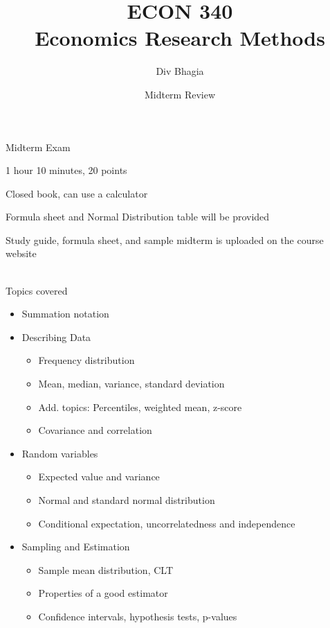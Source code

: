 \documentclass{./../div_teaching_slides}
\begin{document}
\title{ECON 340 \\ Economics Research Methods}
\author{Div Bhagia}
\date{Midterm Review}

\begin{frame}
\maketitle
\end{frame}

\begin{frame}{Midterm Exam}
\begin{witemize}
	\item 1 hour 10 minutes, 20 points 
	\item Closed book, can use a calculator 
	\item Formula sheet and Normal Distribution table will be provided 
	\item Study guide, formula sheet, and sample midterm is uploaded on the course website \\~\\
\end{witemize}
\end{frame}

\begin{frame}{Topics covered}
\vspace{-0.85em}
\begin{itemize}
\item Summation notation
\item Describing Data \\ 
\begin{itemize}
\item Frequency distribution
\item Mean, median, variance, standard deviation 
\item Add. topics: Percentiles, weighted mean, z-score
\item Covariance and correlation
\end{itemize}
\item Random variables \\
\begin{itemize}
\item Expected value and variance 
\item Normal and standard normal distribution
\item Conditional expectation, uncorrelatedness and independence
\end{itemize}
\item Sampling and Estimation \\
\begin{itemize}
\item Sample mean distribution, CLT
\item Properties of a good estimator
\item Confidence intervals, hypothesis tests, p-values
\end{itemize}
\end{itemize}
\end{frame}
\end{document}
